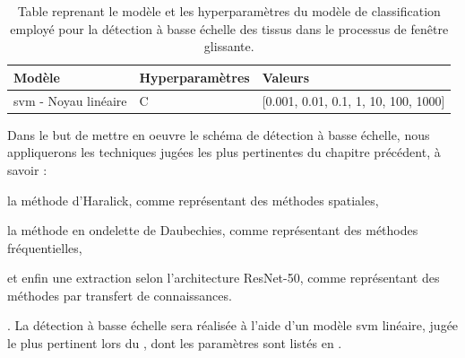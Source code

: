 \begin{table}[H]
    \centering
    \begin{tabular}{lll}
        \toprule
        \textbf{Modèle}                                 & \textbf{Hyperparamètres}  & \textbf{Valeurs}                          \\ \midrule
        \gls{svm} - Noyau linéaire                      & C                         & [0.001, 0.01, 0.1, 1, 10, 100, 1000]      \\ 
        \bottomrule 
    \end{tabular} 
    \caption{Table reprenant le modèle et les hyperparamètres du modèle de classification employé pour la détection à basse échelle des tissus dans le processus de fenêtre glissante.}
    \label{tab:parameters_image_improvement_sliding_window_models}
\end{table}\par

Dans le but de mettre en oeuvre le schéma de détection à basse échelle, nous appliquerons les techniques jugées les plus pertinentes du chapitre précédent, à savoir : 
\begin{inlinerate}
    \item la méthode d'Haralick, comme représentant des méthodes spatiales,
    \item la méthode en ondelette de Daubechies, comme représentant des méthodes fréquentielles,
    \item et enfin une extraction selon l'architecture ResNet-50, comme représentant des méthodes par transfert de connaissances.
\end{inlinerate}. La détection à basse échelle sera réalisée à l'aide d'un modèle \gls{svm} linéaire, jugée le plus pertinent lors du , dont les paramètres sont listés en .\par

